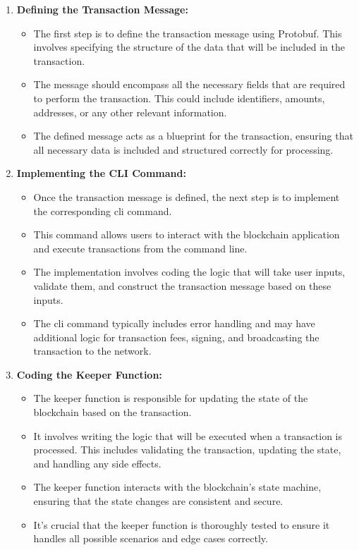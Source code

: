 \begin{enumerate}
    \item \textbf{Defining the Transaction Message:}
    \begin{itemize}
        \item The first step is to define the transaction message using Protobuf. This involves specifying the structure of the data that will be included in the transaction. 
        \item The message should encompass all the necessary fields that are required to perform the transaction. This could include identifiers, amounts, addresses, or any other relevant information.
        \item The defined message acts as a blueprint for the transaction, ensuring that all necessary data is included and structured correctly for processing.
    \end{itemize}

    \item \textbf{Implementing the CLI Command:}
    \begin{itemize}
        \item Once the transaction message is defined, the next step is to implement the corresponding \gls{cli} command.
        \item This command allows users to interact with the blockchain application and execute transactions from the command line.
        \item The implementation involves coding the logic that will take user inputs, validate them, and construct the transaction message based on these inputs.
        \item The \gls{cli} command typically includes error handling and may have additional logic for transaction fees, signing, and broadcasting the transaction to the network.
    \end{itemize}
    \item \textbf{Coding the Keeper Function:}
    \begin{itemize}
        \item The keeper function is responsible for updating the state of the blockchain based on the transaction.
        \item It involves writing the logic that will be executed when a transaction is processed. This includes validating the transaction, updating the state, and handling any side effects.
        \item The keeper function interacts with the blockchain's state machine, ensuring that the state changes are consistent and secure.
        \item It's crucial that the keeper function is thoroughly tested to ensure it handles all possible scenarios and edge cases correctly.
    \end{itemize}
\end{enumerate}

